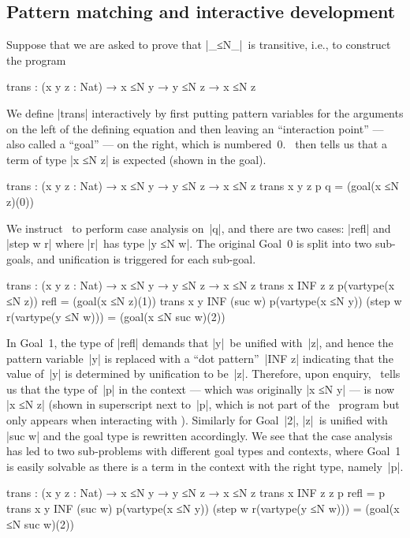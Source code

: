 \subsection{Pattern matching and interactive development}
\label{sec:interaction}

Suppose that we are asked to prove that |_≤N_|~is transitive, i.e., to construct the program
\begin{code}
trans : (x y z : Nat) → x ≤N y → y ≤N z → x ≤N z
\end{code}
We define |trans| interactively by first putting pattern variables for the arguments on the left of the defining equation and then leaving an ``interaction point'' --- also called a ``goal'' --- on the right, which is numbered~0.
\Agda\ then tells us that a term of type |x ≤N z| is expected (shown in the goal).
\begin{code}
trans : (x y z : Nat) → x ≤N y → y ≤N z → x ≤N z
trans x y z p q = (goal(x ≤N z)(0))
\end{code}
We instruct \Agda\ to perform case analysis on~|q|, and there are two cases: |refl| and |step w r| where |r|~has type |y ≤N w|.
The original Goal~0 is split into two sub-goals, and unification is triggered for each sub-goal.
\begin{code}
trans : (x y z : Nat) → x ≤N y → y ≤N z → x ≤N z
trans x  INF  z        z        p(vartype(x ≤N z))  refl                         = (goal(x ≤N z)(1))
trans x       y   INF  (suc w)  p(vartype(x ≤N y))  (step w r(vartype(y ≤N w)))  = (goal(x ≤N suc w)(2))
\end{code}
In Goal~1, the type of |refl| demands that |y|~be unified with~|z|, and hence the pattern variable~|y| is replaced with a ``dot pattern''~|INF z| indicating that the value of~|y| is determined by unification to be~|z|.
Therefore, upon enquiry, \Agda\ tells us that the type of~|p| in the context --- which was originally |x ≤N y| --- is now |x ≤N z| (shown in superscript next to~|p|, which is not part of the \Agda\ program but only appears when interacting with \Agda).
Similarly for Goal~|2|, |z|~is unified with |suc w| and the goal type is rewritten accordingly.
We see that the case analysis has led to two sub-problems with different goal types and contexts, where Goal~1 is easily solvable as there is a term in the context with the right type, namely~|p|.
\begin{code}
trans : (x y z : Nat) → x ≤N y → y ≤N z → x ≤N z
trans x  INF  z       z        p                   refl                         = p
trans x       y  INF  (suc w)  p(vartype(x ≤N y))  (step w r(vartype(y ≤N w)))  = (goal(x ≤N suc w)(2))
\end{code}
